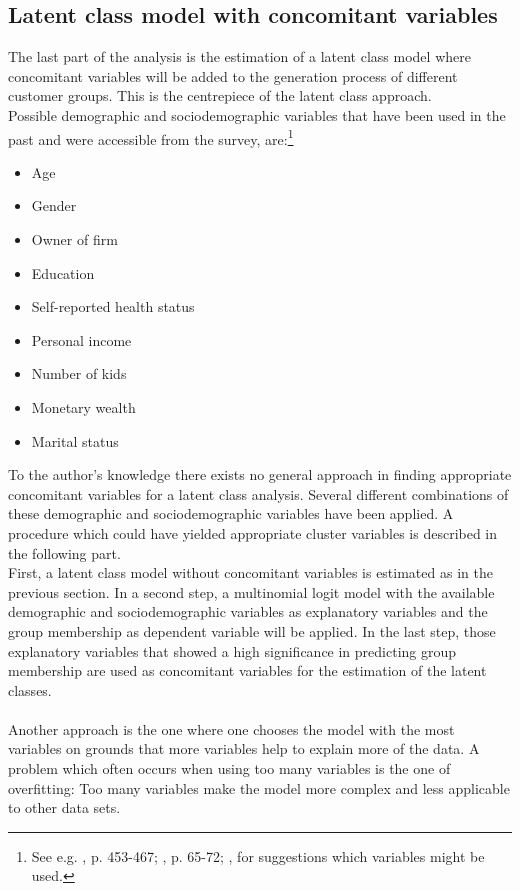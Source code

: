 \documentclass[12pt, abstracton]{article}
\begin{document}
\subsection{Latent class model with concomitant variables}
\label{lc_model_with}
The last part of the analysis is the estimation of a latent class model where concomitant variables will be added to the generation process of different customer groups. This is the centrepiece of the latent class approach.\\ 
Possible demographic and sociodemographic variables that have been used in the past and were accessible from the survey, are:\footnote{See e.g. \cite{Burnett1984}, p. 453-467; \cite{2013}, p. 65-72; \cite{Ahmed2009}, for suggestions which variables might be used.}
\begin{itemize}
	\item Age
	\item Gender
	\item Owner of firm
	\item Education 
	\item Self-reported health status
	\item Personal income
	\item Number of kids
	\item Monetary wealth
	\item Marital status
\end{itemize}
To the author's knowledge there exists no general approach in finding appropriate concomitant variables for a latent class analysis. 
Several different combinations of these demographic and sociodemographic variables have been applied. A procedure which could have yielded appropriate cluster variables is described in the following part.\\
First, a latent class model without concomitant variables is estimated as in the previous section. In a second step, a multinomial logit model with the available demographic and sociodemographic variables as explanatory variables and the group membership as dependent variable will be applied. In the last step, those explanatory variables that showed a high significance in predicting group membership are used as concomitant variables for the estimation of the latent classes.\\\\
Another approach is the one where one chooses the model with the most variables on grounds that more variables help to explain more of the data. A problem which often occurs when using too many variables is the one of overfitting: Too many variables make the model more complex and less applicable to other data sets.\\
\end{document}
